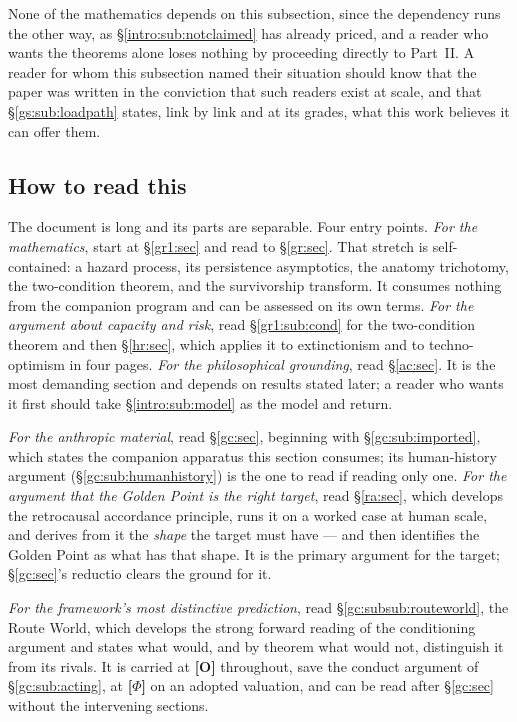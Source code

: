 \documentclass[11pt]{article}
\numberwithin{equation}{section}
\theoremstyle{plain}
\theoremstyle{definition}
\theoremstyle{remark}
\begin{document}
None of the mathematics depends on this subsection, since the
dependency runs the other way, as \S\ref{intro:sub:notclaimed} has
already priced, and a reader who wants the theorems alone loses
nothing by proceeding directly to Part~II. A reader for whom this
subsection named their situation should know that the paper was
written in the conviction that such readers exist at scale, and that
\S\ref{gs:sub:loadpath} states, link by link and at its grades, what
this work believes it can offer them.

\subsection{How to read this}\label{intro:sub:reading}

The document is long and its parts are separable. Four entry points. \emph{For the mathematics}, start at \S\ref{gr1:sec} and read to
\S\ref{gr:sec}. That stretch is self-contained: a hazard process, its
persistence asymptotics, the anatomy trichotomy, the two-condition
theorem, and the survivorship transform. It consumes nothing from the
companion program and can be assessed on its own terms. \emph{For the argument about capacity and risk}, read
\S\ref{gr1:sub:cond} for the two-condition theorem and then
\S\ref{hr:sec}, which applies it to extinctionism and to
techno-optimism in four pages. \emph{For the philosophical grounding}, read \S\ref{ac:sec}. It is the
most demanding section and depends on results stated later; a reader who
wants it first should take \S\ref{intro:sub:model} as the model and
return.

\emph{For the anthropic material}, read \S\ref{gc:sec}, beginning with
\S\ref{gc:sub:imported}, which states the companion apparatus this
section consumes; its human-history argument
(\S\ref{gc:sub:humanhistory}) is the one to read if reading only one. \emph{For the argument that the Golden Point is the right target}, read
\S\ref{ra:sec}, which develops the retrocausal accordance principle,
runs it on a worked case at human scale, and derives from it the
\emph{shape} the target must have --- and then identifies the Golden
Point as what has that shape. It is the primary argument for the target;
\S\ref{gc:sec}'s reductio clears the ground for it.

\emph{For the framework's most distinctive prediction}, read
\S\ref{gc:subsub:routeworld}, the Route World, which develops the strong
forward reading of the conditioning argument and states what would, and by theorem what would not, distinguish it from its rivals. It is
carried at \textbf{[O]} throughout, save the conduct argument of
\S\ref{gc:sub:acting}, at \textbf{[$\Phi$]} on an
adopted valuation, and can be read after \S\ref{gc:sec}
without the intervening sections.
\end{document}
